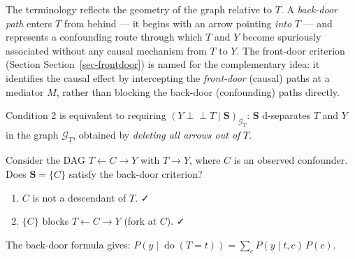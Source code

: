 \documentclass[
  a4paper,
]{book}
\providecommand{\tightlist}{%
  \setlength{\itemsep}{0pt}\setlength{\parskip}{0pt}}
\newcommand{\doop}{\operatorname{do}}
\newcommand{\indep}{\perp\!\!\!\perp}
\newcommand{\Gcal}{\mathcal{G}}
\begin{document}
\begin{tcolorbox}[enhanced jigsaw, arc=.35mm, bottomrule=.15mm, bottomtitle=1mm, breakable, colback=white, colbacktitle=quarto-callout-note-color!10!white, colframe=quarto-callout-note-color-frame, coltitle=black, left=2mm, leftrule=.75mm, opacityback=0, opacitybacktitle=0.6, rightrule=.15mm, title={Remark}, titlerule=0mm, toprule=.15mm, toptitle=1mm]

The terminology reflects the geometry of the graph relative to \(T\). A
\emph{back-door path} enters \(T\) from behind --- it begins with an
arrow pointing \emph{into} \(T\) --- and represents a confounding route
through which \(T\) and \(Y\) become spuriously associated without any
causal mechanism from \(T\) to \(Y\). The front-door criterion (Section
Section~\ref{sec-frontdoor}) is named for the complementary idea: it
identifies the causal effect by intercepting the \emph{front-door}
(causal) paths at a mediator \(M\), rather than blocking the back-door
(confounding) paths directly.

Condition 2 is equivalent to requiring
\((Y \indep T \mid \mathbf{S})_{\Gcal_{\underline{T}}}\): \(\mathbf{S}\)
d-separates \(T\) and \(Y\) in the graph \(\Gcal_{\underline{T}}\),
obtained by \emph{deleting all arrows out of} \(T\).

\end{tcolorbox}

\begin{tcolorbox}[enhanced jigsaw, arc=.35mm, bottomrule=.15mm, bottomtitle=1mm, breakable, colback=white, colbacktitle=quarto-callout-note-color!10!white, colframe=quarto-callout-note-color-frame, coltitle=black, left=2mm, leftrule=.75mm, opacityback=0, opacitybacktitle=0.6, rightrule=.15mm, title={Example: A Single Confounder}, titlerule=0mm, toprule=.15mm, toptitle=1mm]

Consider the DAG \(T \leftarrow C \to Y\) with \(T \to Y\), where \(C\)
is an observed confounder. Does \(\mathbf{S} = \{C\}\) satisfy the
back-door criterion?

\begin{enumerate}
\def\labelenumi{\arabic{enumi}.}
\tightlist
\item
  \(C\) is not a descendant of \(T\). ✓
\item
  \(\{C\}\) blocks \(T \leftarrow C \to Y\) (fork at \(C\)). ✓
\end{enumerate}

The back-door formula gives:
\(P(y \mid \doop(T{=}t)) = \sum_c P(y \mid t, c)\,P(c).\)

\end{tcolorbox}
\end{document}
